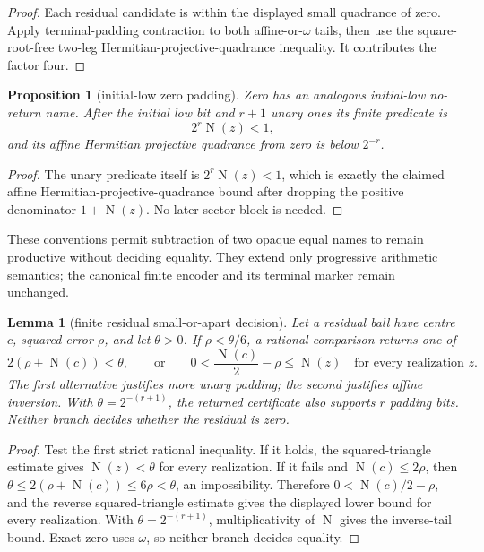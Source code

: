\documentclass[10pt]{article}
\newtheorem{lemma}[theorem]{Lemma}
\newtheorem{proposition}[theorem]{Proposition}
\theoremstyle{definition}
\theoremstyle{remark}
\newcommand{\Norm}{\operatorname{N}}
\begin{document}
\begin{proof}
Each residual candidate is within the displayed small quadrance of zero.
Apply terminal-padding contraction to both affine-or-$\omega$ tails, then use
the square-root-free two-leg Hermitian-projective-quadrance inequality.  It
contributes the factor
four.
\end{proof}

\begin{proposition}[initial-low zero padding]
Zero has an analogous initial-low no-return name.  After the initial low bit
and $r+1$ unary ones its finite predicate is
\[
 2^r\Norm(z)<1,
\]
and its affine Hermitian projective quadrance from zero is below $2^{-r}$.
\end{proposition}

\begin{proof}
The unary predicate itself is $2^r\Norm(z)<1$, which is exactly the claimed
affine Hermitian-projective-quadrance bound after dropping the positive denominator
$1+\Norm(z)$.  No later sector block is needed.
\end{proof}

These conventions permit subtraction of two opaque equal names to remain
productive without deciding equality.  They extend only progressive
arithmetic semantics; the canonical finite encoder and its terminal marker
remain unchanged.

\begin{lemma}[finite residual small-or-apart decision]
\label{lem:residual-small-or-apart}
Let a residual ball have centre $c$, squared error $\rho$, and let
$\theta>0$.  If $\rho<\theta/6$, a rational comparison returns one of
\[
 2(\rho+\Norm(c))<\theta,
 \qquad\text{or}\qquad
 0<\frac{\Norm(c)}2-\rho\le\Norm(z)
 \quad\text{for every realization }z.
\]
The first alternative justifies more unary padding; the second justifies
affine inversion.  With $\theta=2^{-(r+1)}$, the returned certificate also
supports $r$ padding bits.  Neither branch decides whether the residual is
zero.
\end{lemma}

\begin{proof}
Test the first strict rational inequality.  If it holds, the squared-triangle
estimate gives $\Norm(z)<\theta$ for every realization.  If it fails and
$\Norm(c)\le2\rho$, then
$\theta\le2(\rho+\Norm(c))\le6\rho<\theta$, an impossibility.
Therefore $0<\Norm(c)/2-\rho$, and the reverse squared-triangle estimate
gives the displayed lower bound for every realization.  With
$\theta=2^{-(r+1)}$, multiplicativity of $\Norm$ gives the inverse-tail
bound.  Exact zero uses $\omega$, so neither branch decides equality.
\end{proof}
\end{document}
